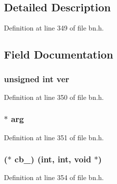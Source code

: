 \subsection{Detailed Description}


Definition at line 349 of file bn.\+h.



\subsection{Field Documentation}
\subsubsection[{\texorpdfstring{ver}{ver}}]{\setlength{\rightskip}{0pt plus 5cm}unsigned int ver}\hypertarget{structbn__gencb__st_aee119b00fe81f0baf8518dae456c9dc9}{}\label{structbn__gencb__st_aee119b00fe81f0baf8518dae456c9dc9}


Definition at line 350 of file bn.\+h.

\subsubsection[{\texorpdfstring{arg}{arg}}]{ $\ast$ arg}\hypertarget{structbn__gencb__st_ae036856e415526e58e249638733f6752}{}\label{structbn__gencb__st_ae036856e415526e58e249638733f6752}


Definition at line 351 of file bn.\+h.

\subsubsection[{\texorpdfstring{cb\+\_\+1}{cb_1}}]{($\ast$ cb\+\_) (int, int, {\bf void} $\ast$)}\hypertarget{structbn__gencb__st_aa539df7ce1350e22f8e6d80851ee9880}{}\label{structbn__gencb__st_aa539df7ce1350e22f8e6d80851ee9880}


Definition at line 354 of file bn.\+h.

